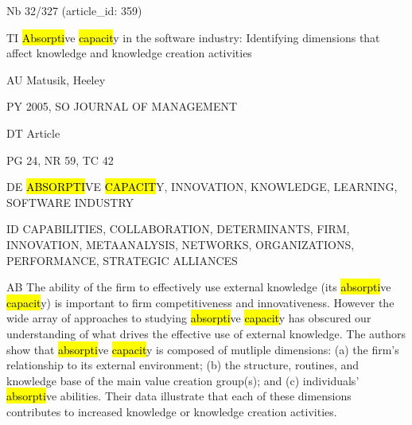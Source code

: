 \documentclass[a4paper]{article}
\begin{document}
\vspace*{-2cm}
Nb \tabto{0cm}32/327 (article\_id: 359)\par
TI \tabto{0cm}\hl{Absorpti}ve \hl{capacit}y in the software industry: Identifying dimensions that affect knowledge and knowledge creation activities\par
AU \tabto{0cm}Matusik, Heeley\par
PY \tabto{0cm}2005, SO JOURNAL OF MANAGEMENT\par
DT \tabto{0cm}Article\par
PG \tabto{0cm}24, NR 59, TC 42\par
DE \tabto{0cm}\hl{ABSORPTI}VE \hl{CAPACIT}Y, INNOVATION, KNOWLEDGE, LEARNING, SOFTWARE INDUSTRY\par
ID \tabto{0cm}CAPABILITIES, COLLABORATION, DETERMINANTS, FIRM, INNOVATION, METAANALYSIS, NETWORKS, ORGANIZATIONS, PERFORMANCE, STRATEGIC ALLIANCES\par
AB \tabto{0cm}The ability of the firm to effectively use external knowledge (its \hl{absorpti}ve \hl{capacit}y) is important to firm competitiveness and innovativeness. However the wide array of approaches to studying \hl{absorpti}ve \hl{capacit}y has obscured our understanding of what drives the effective use of external knowledge. The authors show that \hl{absorpti}ve \hl{capacit}y is composed of mutliple dimensions: (a) the firm's relationship to its external environment; (b) the structure, routines, and knowledge base of the main value creation group(s); and (c) individuals' \hl{absorpti}ve abilities. Their data illustrate that each of these dimensions contributes to increased knowledge or knowledge creation activities.\par
\clearpage
\end{document}
